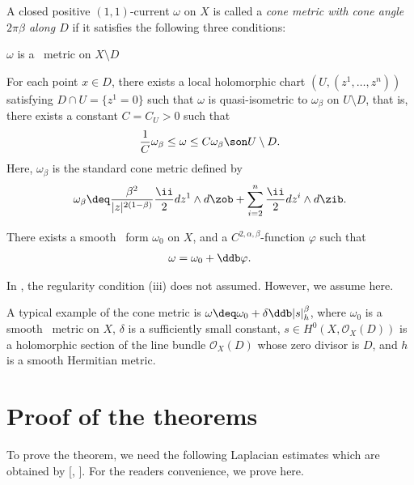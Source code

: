 \documentclass[12pt]{amsart}
\begin{document}
\begin{definition}\label{ConeDef}
A closed positive $(1,1)$-current $\omega$ on $X$ is called a {\it cone metric with cone angle $2\pi \beta $ along $D$} if it satisfies the following three conditions:
\begin{enui}
	\item $\omega$ is a \kahler \ metric on $X\setminus D$
	\item For each point $x \in D$, there exists a local holomorphic chart $(U, (z^1, \dots, z^n))$ satisfying $D\cap U =\{ z^1 =0 \}$ such that $\omega $ is quasi-isometric to $\omega_\beta$ on $U\setminus D$, that is, there exists a constant $C= C_U >0$ such that
		\begin{align*}
			\dfrac{1}{C} \omega_\beta \le \omega \le C \omega_\beta \son U \setminus D.
		\end{align*}
	Here, $\omega_\beta $ is the standard cone metric defined by 
					\begin{align*}
						\omega_\beta  \deq \dfrac{\beta ^2}{|z|^{2(1-\beta )}}\dfrac{\ii}{2} dz^1 \wedge d\zob  + \sum_{i=2}^n \dfrac{\ii}{2}  dz^i \wedge d\zib.			
					\end{align*}
	\item There exists a smooth \kahler \ form $\omega_0$ on $X$, and a $ C^{2,\alpha ,\beta}$-function $ \varphi $ such that 
			\begin{align*}
					\omega = \omega_0 + \ddb \varphi .
				\end{align*}	
\end{enui}
\end{definition}
In \citep{Jeffres00}, the regularity condition (iii) does not assumed. However, we assume here.

A typical example of the cone metric is $\omega \deq \omega _0 + \delta \ddb |s|_h^{\beta}$, where $\omega_0$ is a smooth \kahler \ metric on $X$, $\delta $ is a sufficiently small constant, $s \in H^0(X, \mathcal{O}_X(D))$ is a holomorphic section of the line bundle $\mathcal{O}_X(D)$ whose zero divisor is $D$, and $h$ is a smooth Hermitian metric. 

\section{Proof of the theorems}

To prove the theorem, we need the following Laplacian estimates which are obtained by [\citet{Chern68}, \citet{Lu68}]. For the readers convenience, we prove here.
\end{document}

